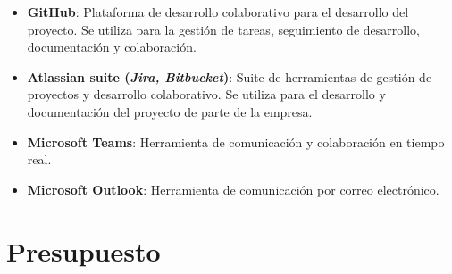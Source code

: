 \begin{itemize}
	\item \textbf{GitHub}: Plataforma de desarrollo colaborativo para el desarrollo del proyecto.
		Se utiliza para la gestión de tareas, seguimiento de desarrollo, documentación y
		colaboración.
	\item \textbf{Atlassian suite (\emph{Jira, Bitbucket})}: Suite de herramientas de gestión de proyectos
		y desarrollo colaborativo. Se utiliza para el desarrollo y documentación del proyecto de
		parte de la empresa.
	\item \textbf{Microsoft Teams}: Herramienta de comunicación y colaboración en tiempo real.
	\item \textbf{Microsoft Outlook}: Herramienta de comunicación por correo electrónico.
\end{itemize}

\newpage{}
\section{Presupuesto}\label{sec:presupuesto}

